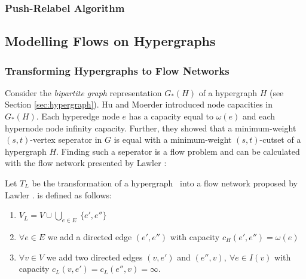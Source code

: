 \subsubsection{Push-Relabel Algorithm}
\label{sec:push_relabel}


\subsection{Modelling Flows on Hypergraphs}
\label{sec:related_model_flow}


\subsubsection{Transforming Hypergraphs to Flow Networks}
\label{sec:related_lawler}

Consider the \emph{bipartite graph} representation $G_*(H)$ of a hypergraph $H$ (see Section \ref{sec:hypergraph}).
Hu and Moerder \cite{HuMoerder85} introduced node capacities in $G_*(H)$. Each hyperedge
node $e$ has a capacity equal to $\omega(e)$ and each hypernode node infinity capacity. 
Further, they showed that a minimum-weight $(s,t)$-vertex seperator in $G$
is equal with a minimum-weight $(s,t)$-cutset of a hypergraph $H$. 
Finding such a seperator is a flow problem and can be calculated with the flow network  
presented by Lawler \cite{lawler1973}:

\begin{definition}
Let $T_L$ be the transformation of a hypergraph \HypergraphDef~into 
a flow network  proposed by Lawler \cite{lawler1973}.  is defined as follows:
\begin{enumerate}
\item $V_L = V \cup \bigcup\limits_{e \in E}\ \{e', e''\}$
\item $\forall e \in E$ we add a directed edge $(e',e'')$ 
      with capacity $c_H(e',e'') = \omega(e)$
\item $\forall v \in V$ we add two directed edges $(v, e')$ and 
      $(e'', v),\ \forall e \in I(v)$ with 
      capacity $c_L(v, e') = c_L(e'',v) = \infty$.
\end{enumerate} 
\end{definition}

